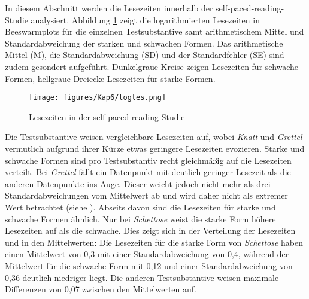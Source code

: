 In diesem Abschnitt werden die Lesezeiten innerhalb der self-paced-reading-Stu\-die analysiert. Abbildung \ref{leslogRT} zeigt die logarithmierten Lesezeiten in Beeswarmplots für die einzelnen Testsubstantive samt arithmetischem Mittel und Standardabweichung der starken und schwachen Formen. Das arithmetische Mittel (M), die Standardabweichung (SD) und der Standardfehler (SE) sind zudem gesondert aufgeführt. Dunkelgraue Kreise zeigen Lesezeiten für schwache Formen, hellgraue Dreiecke Lesezeiten für starke Formen. 

\begin{figure}
\texttt{[image: figures/Kap6/logles.png]} 
\caption{Lesezeiten in der self-paced-reading-Studie}
\label{leslogRT}
\end{figure}

Die Testsubstantive weisen vergleichbare Lesezeiten auf, wobei \textit{Knatt} und \textit{Grettel} vermutlich aufgrund ihrer Kürze etwas geringere Lesezeiten evozieren. Starke und schwache Formen sind pro Testsubstantiv recht gleichmäßig auf die Lesezeiten verteilt. Bei \textit{Grettel} fällt ein Datenpunkt mit deutlich geringer Lesezeit als die anderen Datenpunkte ins Auge. Dieser weicht jedoch nicht mehr als drei Standardabweichungen vom Mittelwert ab und wird daher nicht als extremer Wert betrachtet (siehe ). Abseits davon sind die Lesezeiten für starke und schwache Formen ähnlich. Nur bei \textit{Schettose} weist die starke Form höhere Lesezeiten auf als die schwache. Dies zeigt sich in der Verteilung der Lesezeiten und in den Mittelwerten: Die Lesezeiten für die starke Form von \textit{Schettose} haben einen Mittelwert von 0,3 mit einer Standardabweichung von 0,4, während der Mittelwert für die schwache Form mit 0,12 und einer Standardabweichung von 0,36 deutlich niedriger liegt. Die anderen Testsubstantive weisen maximale Differenzen von 0,07 zwischen den Mittelwerten auf.


